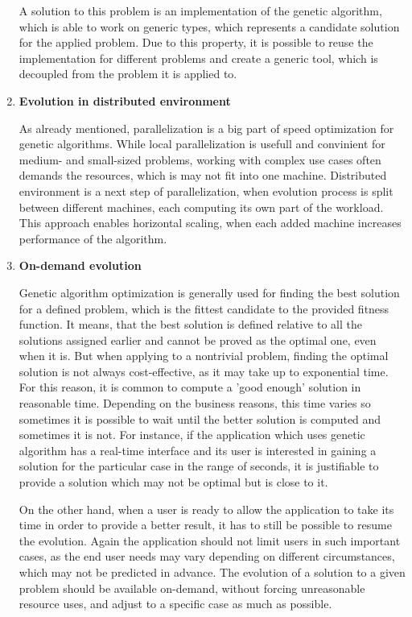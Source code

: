 \begin{enumerate}
A solution to this problem is an implementation of the genetic algorithm, which is able to work on generic types, which represents a candidate solution for the applied problem. Due to this property, it is possible to reuse the implementation for different problems and create a generic tool, which is decoupled from the problem it is applied to.
\medbreak

\item \label{freq:distributed} \textbf{Evolution in distributed environment}

As already mentioned, parallelization is a big part of speed optimization for genetic algorithms. While local parallelization is usefull and convinient for medium- and small-sized problems, working with complex use cases often demands the resources, which is may not fit into one machine. Distributed environment is a next step of parallelization, when evolution process is split between different machines, each computing its own part of the workload. This approach enables horizontal scaling, when each added machine increases performance of the algorithm.  
\medbreak

\item \label{freq:on-demand} \textbf{On-demand evolution}

Genetic algorithm optimization is generally used for finding the best solution for a defined problem, which is the fittest candidate to the provided fitness function. It means, that the best solution is defined relative to all the solutions assigned earlier and cannot be proved as the optimal one, even when it is. But when applying to a nontrivial problem, finding the optimal solution is not always cost-effective, as it may take up to exponential time. For this reason, it is common to compute a 'good enough' solution in reasonable time. Depending on the business reasons, this time varies so sometimes it is possible to wait until the better solution is computed and sometimes it is not. For instance, if the application which uses genetic algorithm has a real-time interface and its user is interested in gaining a solution for the particular case in the range of seconds, it is justifiable to provide a solution which may not be optimal but is close to it.

On the other hand, when a user is ready to allow the application to take its time in order to provide a better result, it has to still be possible to resume the evolution. Again the application should not limit users in such important cases, as the end user needs may vary depending on different circumstances, which may not be predicted in advance. The evolution of a solution to a given problem should be available on-demand, without forcing unreasonable resource uses, and adjust to a specific case as much as possible.
\medbreak
\end{enumerate}